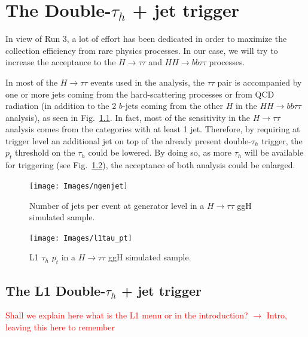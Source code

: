 \documentclass[../main.tex]{subfiles}
\begin{document}
\chapter{The Double-$\tau_h$ + jet trigger}

In view of Run 3, a lot of effort has been dedicated in order to maximize the collection efficiency from rare physics processes. In our case, we will try to increase the acceptance to the $H\to\tau\tau$ and $HH\to bb\tau\tau$ processes.

In most of the $H\to\tau\tau$ events used in the analysis, the $\tau\tau$ pair is accompanied by one or more jets coming from the hard-scattering processes or from QCD radiation (in addition to the 2 $b$-jets coming from the other $H$ in the $HH\to bb\tau\tau$ analysis), as seen in Fig.~\ref{hh:fig:trig_ngenjets}. In fact, most of the sensitivity in the $H\to\tau\tau$ analysis \cite{hh:htt_2016} comes from the categories with at least 1 jet. Therefore, by requiring at trigger level an additional jet on top of the already present double-$\tau_h$ trigger, the $p_t$ threshold on the $\tau_h$ could be lowered. By doing so, as more $\tau_h$ will be available for triggering (see Fig.~\ref{hh:fig:trig_l1tau_pt}), the acceptance of both analysis could be enlarged.


\begin{figure}[h!]
\begin{center}
\texttt{[image: Images/ngenjet]}
\end{center}
\caption{Number of jets  per event at generator level in a $H\to\tau\tau$ ggH simulated sample.}
\label{hh:fig:trig_ngenjets}
\end{figure}

\begin{figure}[h!]
\begin{center}
\texttt{[image: Images/l1tau\_pt]}
\end{center}
\caption{L1 $\tau_h$ $p_t$ in a $H\to\tau\tau$ ggH simulated sample.}
\label{hh:fig:trig_l1tau_pt}
\end{figure}



\section{The L1 Double-$\tau_h$ + jet trigger}

\textcolor{red}{Shall we explain here what is the L1 menu or in the introduction? $\to$ Intro, leaving this here to remember}
\end{document}
